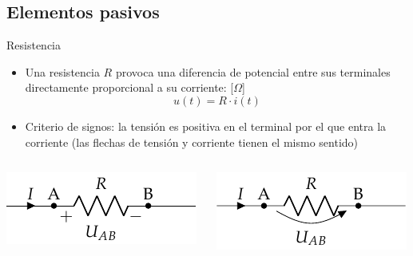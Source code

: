 \documentclass[aspectratio=169, xcolor={usenames,svgnames,dvipsnames}]{beamer}
\begin{document}
\subsection{Elementos pasivos}
\begin{frame}{Resistencia}
\begin{itemize}
\item Una \alert{resistencia} $R$ provoca una \alert{diferencia de potencial} entre sus terminales \alert{directamente proporcional} a su corriente:  [\(\Omega\)]
\[
\boxed{u(t) = R \cdot i(t)}
\]
\item \alert{Criterio de signos}: la tensión es positiva en el terminal por el que entra la corriente (las flechas de tensión y corriente tienen el mismo sentido)
\end{itemize}
\begin{columns}
\begin{column}{0.5\columnwidth}
\begin{center}
\includegraphics[height=0.2\textheight]{../figs/Resistencia.pdf}
\end{center}
\end{column}
\begin{column}{0.5\columnwidth}
\begin{center}
\includegraphics[height=0.2\textheight]{../figs/Resistencia_Flecha.pdf}
\end{center}
\end{column}
\end{columns}
\end{frame}
\end{document}
